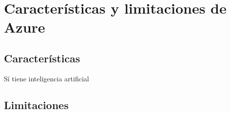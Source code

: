 \chapter{Características y limitaciones de Azure}
\section{Características}
Sí tiene inteligencia artificial

\section{Limitaciones}
